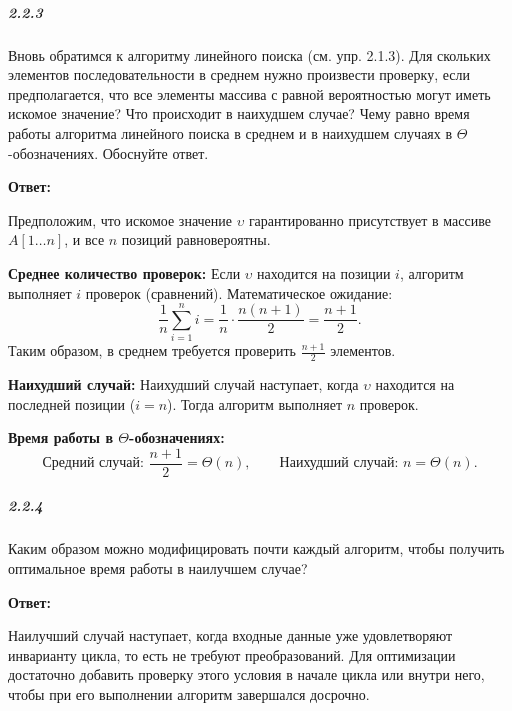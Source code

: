 \subparagraph{2.2.3}
Вновь обратимся к алгоритму линейного поиска (см. упр. 2.1.3). 
Для скольких элементов последовательности в среднем нужно произвести проверку,
если предполагается, что все элементы массива с равной вероятностью могут иметь искомое значение?
Что происходит в наихудшем случае? Чему равно время работы алгоритма линейного поиска в среднем и в наихудшем случаях в $\Theta$-обозначениях. Обоснуйте ответ.

\textbf{Ответ:}

Предположим, что искомое значение $\upsilon$ гарантированно присутствует в массиве $A[1 \ldots n]$, и все $n$ позиций равновероятны.

\textbf{Среднее количество проверок:}
Если $\upsilon$ находится на позиции $i$, алгоритм выполняет $i$ проверок (сравнений). Математическое ожидание:
\[
\frac{1}{n} \sum_{i=1}^{n} i = \frac{1}{n} \cdot \frac{n(n+1)}{2} = \frac{n+1}{2}.
\]
Таким образом, в среднем требуется проверить $\frac{n+1}{2}$ элементов.

\textbf{Наихудший случай:}
Наихудший случай наступает, когда $\upsilon$ находится на последней позиции ($i = n$). Тогда алгоритм выполняет $n$ проверок.

\textbf{Время работы в $\Theta$-обозначениях:}
\[
\text{Средний случай: } \frac{n+1}{2} = \Theta(n), \qquad
\text{Наихудший случай: } n = \Theta(n).
\]

\subparagraph{2.2.4}
Каким образом можно модифицировать почти каждый алгоритм, чтобы получить оптимальное время работы в наилучшем случае?

\textbf{Ответ:}

Наилучший случай наступает, когда входные данные уже удовлетворяют инварианту цикла, то есть не требуют преобразований. 
Для оптимизации достаточно добавить проверку этого условия в начале цикла или внутри него, чтобы при его выполнении алгоритм завершался досрочно.